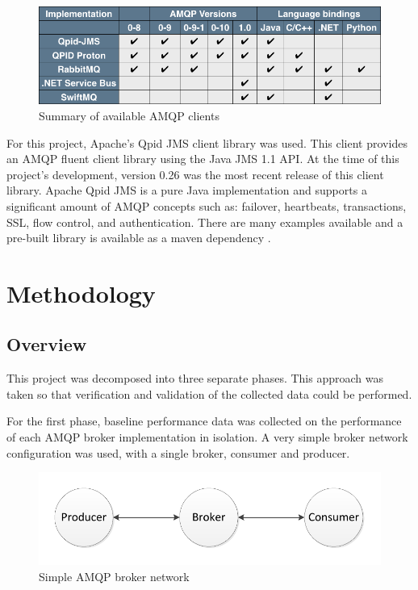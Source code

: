 \documentclass{thesis}
\begin{document}
\begin{figure}[ht]
\centering
\includegraphics[scale=.5]{client_comparision}  
\caption{Summary of available AMQP clients}
\label{fig:amqp-clients}
\end{figure}

For this project, Apache's Qpid JMS client library was used.  This client provides an AMQP fluent client library using the Java JMS 1.1 API.  At the time of this project's development, version 0.26 was the most recent release of this client library.  Apache Qpid JMS is a pure Java implementation and supports a significant amount of AMQP concepts such as: failover, heartbeats, transactions, SSL, flow control, and authentication.  There are many examples available and a pre-built library is available as a maven dependency \cite{APACHE-QPID-JMS}.  

\chapter{Methodology}
\section{Overview}
This project was decomposed into three separate phases.  This approach was taken so that verification and validation of the collected data could be performed.  

For the first phase, baseline performance data was collected on the performance of each AMQP broker implementation in isolation.  A very simple broker network configuration was used, with a single broker, consumer and producer.

\begin{figure}[ht]
\centering
\includegraphics[scale=.75]{direct_connect}  
\caption{Simple AMQP broker network}
\label{fig:simple-broker-network}
\end{figure}
\end{document}

